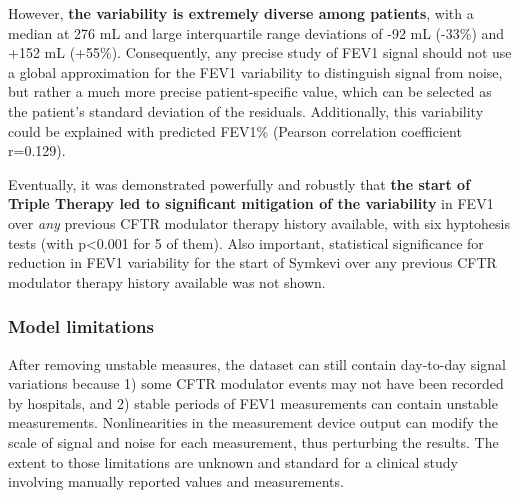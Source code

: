 However, \textbf{the variability is extremely diverse among patients}, with a median at 276 mL and large interquartile range deviations of -92 mL (-33\%) and +152 mL (+55\%). Consequently, any precise study of FEV1 signal should not use a global approximation for the FEV1 variability to distinguish signal from noise, but rather a much more precise patient-specific value, which can be selected as the patient's standard deviation of the residuals. Additionally, this variability could be explained with predicted FEV1\% (Pearson correlation coefficient r=0.129). 

Eventually, it was demonstrated powerfully and robustly that \textbf{the start of Triple Therapy led to significant mitigation of the variability} in FEV1 over \textit{any} previous CFTR modulator therapy history available, with six hyptohesis tests (with p<0.001 for 5 of them). Also important, statistical significance for reduction in FEV1 variability for the start of Symkevi over any previous CFTR modulator therapy history available was not shown.

\subsubsection{Model limitations}
After removing unstable measures, the dataset can still contain day-to-day signal variations because 1) some CFTR modulator events may not have been recorded by hospitals, and 2) stable periods of FEV1 measurements can contain unstable measurements.  Nonlinearities in the measurement device output can modify the scale of signal and noise for each measurement, thus perturbing the results. The extent to those limitations are unknown and standard for a clinical study involving manually reported values and measurements.